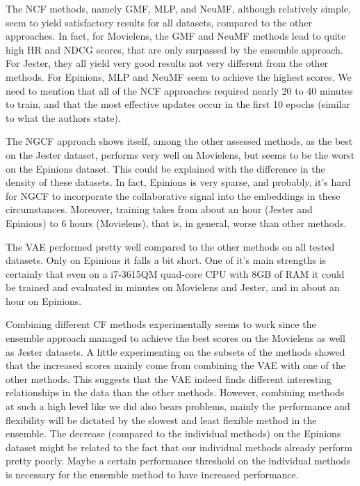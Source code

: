 
The NCF methods, namely GMF, MLP, and NeuMF, although relatively simple, seem to yield satisfactory results for all datasets, compared to the other approaches. 
In fact, for Movielens, the GMF and NeuMF methods lead to quite high HR and NDCG scores, that are only surpassed by the ensemble approach.
For Jester, they all yield very good results not very different from the other methods.
For Epinions, MLP and NeuMF seem to achieve the highest scores.
We need to mention that all of the NCF approaches required nearly 20 to 40 minutes to train, and that the most effective updates occur in the first 10 epochs (similar to what the authors state).


The NGCF approach shows itself, among the other assessed methods, as the best on the Jester dataset, performs very well on Movielens, but seems to be the worst on the Epinions dataset.
This could be explained with the difference in the density of these datasets.
In fact, Epinions is very sparse, and probably, it's hard for NGCF to incorporate the collaborative signal into the embeddings in these circumstances.
Moreover, training takes from about an hour (Jester and Epinions) to 6 hours (Movielens), that is, in general, worse than other methods.

The VAE performed pretty well compared to the other methods on all tested datasets. 
Only on Epinions it falls a bit short. 
One of it's main strengths is certainly that even on a i7-3615QM quad-core CPU with 8GB of RAM it could be trained and evaluated in minutes on Movielens and Jester, and in about an hour on Epinions.

Combining different CF methods experimentally seems to work since the ensemble approach managed to achieve the best scores on the Movielens as well as Jester datasets. 
A little experimenting on the subsets of the methods showed that the increased scores mainly  come from combining the VAE with one of the other methods. 
This suggests that the VAE indeed finds different interesting relationships in the data than the other methods. 
However, combining methods at such a high level like we did also bears problems, mainly the performance and flexibility will be dictated by the slowest and least flexible method in the ensemble. 
The decrease (compared to the individual methods) on the Epinions dataset might be related to the fact that our individual methods already perform pretty poorly. 
Maybe a certain performance threshold on the individual methods is necessary for the ensemble method to have increased performance.

